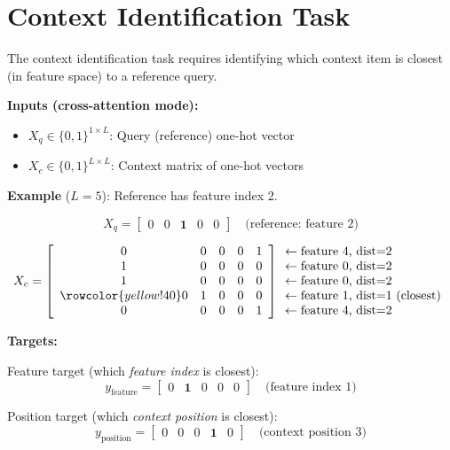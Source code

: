 \documentclass[12pt]{article}
\begin{document}
\section*{Context Identification Task}

The context identification task requires identifying which context item is closest (in feature space) to a reference query.

\textbf{Inputs (cross-attention mode):}
\begin{itemize}
    \item $X_q \in \{0,1\}^{1 \times L}$: Query (reference) one-hot vector
    \item $X_c \in \{0,1\}^{L \times L}$: Context matrix of one-hot vectors
\end{itemize}

\vspace{1em}
\textbf{Example} ($L=5$): Reference has feature index 2.

\[
X_q = \begin{bmatrix} 0 & 0 & \mathbf{1} & 0 & 0 \end{bmatrix}
\quad \text{(reference: feature 2)}
\]

\[
X_c = \left[
\begin{array}{ccccc}
0 & 0 & 0 & 0 & 1 \\
1 & 0 & 0 & 0 & 0 \\
1 & 0 & 0 & 0 & 0 \\
\rowcolor{yellow!40} 0 & 1 & 0 & 0 & 0 \\
0 & 0 & 0 & 0 & 1 \\
\end{array}
\right]
\begin{array}{l}
\leftarrow \text{feature 4, dist=2} \\
\leftarrow \text{feature 0, dist=2} \\
\leftarrow \text{feature 0, dist=2} \\
\leftarrow \text{feature 1, dist=1 (closest)} \\
\leftarrow \text{feature 4, dist=2} \\
\end{array}
\]

\vspace{1em}
\textbf{Targets:}

\vspace{0.5em}
Feature target (which \emph{feature index} is closest):
\[
y_{\text{feature}} = \begin{bmatrix} 0 & \mathbf{1} & 0 & 0 & 0 \end{bmatrix}
\quad \text{(feature index 1)}
\]

Position target (which \emph{context position} is closest):
\[
y_{\text{position}} = \begin{bmatrix} 0 & 0 & 0 & \mathbf{1} & 0 \end{bmatrix}
\quad \text{(context position 3)}
\]
\end{document}
